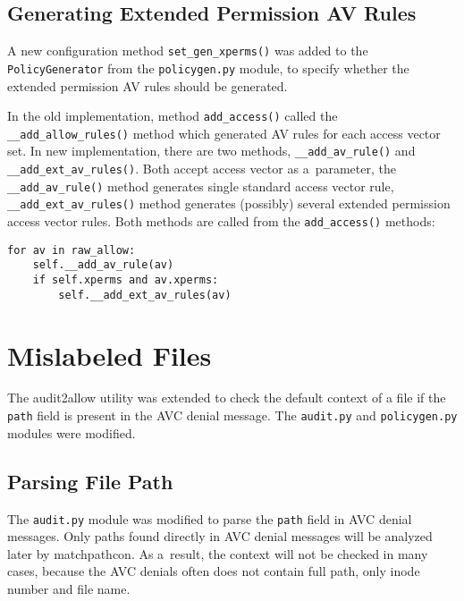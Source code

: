 \subsection{Generating Extended Permission AV Rules}
A new configuration method \texttt{set\_gen\_xperms()} was added to the
\texttt{PolicyGenerator} from the \texttt{policygen.py} module, to specify
whether the extended permission AV rules should be generated.

In the old implementation, method \texttt{add\_access()} called the
\texttt{\_\_add\_allow\_rules()} method which generated AV rules for each
access vector set. In new implementation, there are two methods,
\texttt{\_\_add\_av\_rule()} and \texttt{\_\_add\_ext\_av\_rules()}. Both accept
access vector as a~parameter, the \texttt{\_\_add\_av\_rule()} method generates
single standard access vector rule, \texttt{\_\_add\_ext\_av\_rules()} method
generates (possibly) several extended permission access vector rules. Both
methods are called from the \texttt{add\_access()} methods:
\begin{lstlisting}
for av in raw_allow:
    self.__add_av_rule(av)
    if self.xperms and av.xperms:
        self.__add_ext_av_rules(av)
\end{lstlisting}


\section{Mislabeled Files}
The audit2allow utility was extended to check the default context of a file if
the \texttt{path} field is present in the AVC denial message. The
\texttt{audit.py} and \texttt{policygen.py} modules were modified.

\subsection{Parsing File Path}
The \texttt{audit.py} module was modified to parse the \texttt{path} field in
AVC denial messages. Only paths found directly in AVC denial messages will be
analyzed later by matchpathcon. As a~result, the context will not be checked in
many cases, because the AVC denials often does not contain full path, only inode
number and file name.

